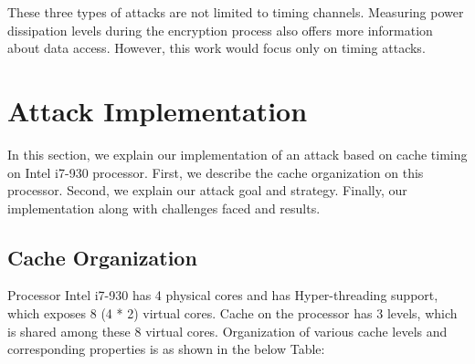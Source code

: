 \documentclass[twocolumn]{IEEEtran}
\begin{document}
These three types of attacks are not limited to timing channels. Measuring power dissipation levels during the encryption process also offers more information about data access. However, this work would focus only on timing attacks.

\section {Attack Implementation}
In this section, we explain our implementation of an attack based on cache timing on Intel i7-930 processor. First, we describe the cache organization on this processor. Second, we explain our attack goal and strategy. Finally, our implementation along with challenges faced and results.
\subsection {Cache Organization}
Processor Intel i7-930 has 4 physical cores and has Hyper-threading support\cite{intelhype}, which exposes 8 (4 * 2) virtual cores. Cache on the processor has 3 levels, which is shared among these 8 virtual cores. Organization of various cache levels and corresponding properties is as shown in the below Table:
\begin{center}
\end{center}
\end{document}
